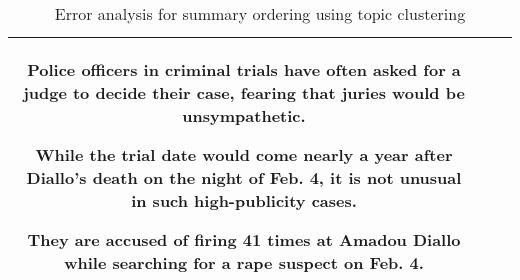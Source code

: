 \begin{table*}[ht]
\begin{tabular}{||c|p{6.5cm}|p{6.5cm}||}
        Police officers in criminal trials have often asked for a judge to decide their case, fearing that juries would be unsympathetic.
        
        While the trial date would come nearly a year after Diallo's death on the night of Feb. 4, it is not unusual in such high-publicity cases.
        
        They are accused of firing 41 times at Amadou Diallo while searching for a rape suspect on Feb. 4.  \\
        \hline\hline 
     \end{tabular} 
     \caption{\normalsize Error analysis for summary ordering using topic clustering}
     \label{tab:clustering_error_analysis}
 \end{table*}
 \normalsize
